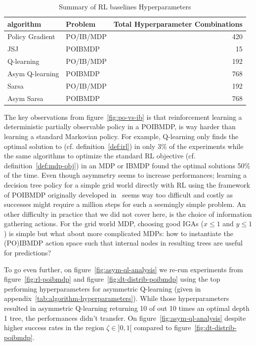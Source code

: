 \begin{table}
    \centering
    \caption{Summary of RL baselines Hyperparameters}\label{tab:ib-params}
    \begin{tabular}{llr}
    \toprule
    \textbf{algorithm} & \textbf{Problem} & \textbf{Total Hyperparameter Combinations} \\
    \midrule
    Policy Gradient & PO/IB/MDP & 420 \\
    JSJ & POIBMDP & 15 \\
    Q-learning & PO/IB/MDP & 192 \\
    Asym Q-learning & POIBMDP & 768 \\
    Sarsa & PO/IB/MDP & 192 \\
    Asym Sarsa & POIBMDP & 768 \\
    \bottomrule
    \end{tabular}
    \end{table}


The key observations from figure~\ref{fig:po-vs-ib} is that reinforcement learning a deterministic partially observable policy in a POIBMDP, is way harder than learning a standard Markovian policy.
For example, Q-learning only finds the optimal solution to (cf. definition~\ref{def:irl}) in only 3\% of the experiments while the same algorithms to optimize the standard RL objective (cf. definition~\ref{def:mdp-obj}) in an MDP or IBMDP found the optimal solutions 50\% of the time.
Even though asymmetry seems to increase performances; learning a decision tree policy for a simple grid world directly with RL using the framework of POIBMDP originally developed in~\cite{topin2021iterative} seems way too difficult and costly as successes might require a million steps for such a seemingly simple problem.
An other difficulty in practice that we did not cover here, is the choice of information gathering actions.
For the grid world MDP, choosing good IGAs ($x\leq1$ and $y\leq1$) is simple but what about more complicated MDPs: how to instantiate the (PO)IBMDP action space such that internal nodes in resulting trees are useful for predictions?

To go even further, on figure~\ref{fig:asym-ql-analysis} we re-run experiments from figure~\ref{fig:rl-poibmdp} and figure~\ref{fig:dt-distrib-poibmdp} using the top performing hyperparameters for asymmetric Q-learning (given in appendix~\ref{tab:algorithm-hyperparameters}).
While those hyperparameters resulted in asymmetric Q-learning returning 10 of out 10 times an optimal depth 1 tree,
the performances didn't transfer.
On figure~\ref{fig:asym-ql-analysis} despite higher success rates in the region $\zeta\in]0,1[$ compared to figure~\ref{fig:dt-distrib-poibmdp}. 

